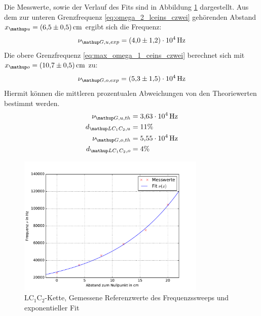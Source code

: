 Die Messwerte, sowie der Verlauf des Fits sind in Abbildung \ref{fig: plot_sweep_LC1C2} dargestellt.
Aus dem zur unteren Grenzfrequenz \eqref{eq:omega_2_lceins_czwei} gehörenden Abstand $x\ua{u} = \SI{6.5(5)}{\cm}$ ergibt sich die Frequenz:
\begin{equation}
  \nu\ua{G, u, exp} = \SI{4.0(12)e4}{\hertz}
\end{equation}
Die obere Grenzfrequenz \eqref{eq:max_omega_1_ceins_czwei} berechnet sich mit $x\ua{o} = \SI{10.7(5)}{\cm}$ zu:
\begin{equation}
    \nu\ua{G, o, exp} = \SI{5.3(15)e4}{\hertz}
\end{equation}
Hiermit können die mittleren prozentualen Abweichungen von den Theoriewerten bestimmt werden.
\begin{align}
  \nu\ua{G,u,th} &= \SI{3.63e4}{\hertz}\\
  d\ua{LC_1C_2,u} &= 11 \%\\
  \nu\ua{G,o,th} &= \SI{5.55e4}{\hertz}\\
  d\ua{LC_1C_2, o} &= 4 \%
\end{align}
\FloatBarrier
\begin{figure}
  \centering
  \includegraphics[width = 0.8\textwidth]{../Messdaten/plots/frequenzsweep_LC1C2.pdf}
  \caption{$\mathup{LC_1C_2}$-Kette, Gemessene Referenzwerte des Frequenzssweeps und exponentieller Fit}
  \label{fig: plot_sweep_LC1C2}
\end{figure}
\newpage
